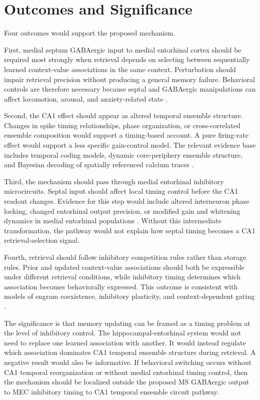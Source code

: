 \section{Outcomes and Significance}

Four outcomes would support the proposed mechanism.

First, medial septum GABAergic input to medial entorhinal cortex should be required most strongly when retrieval depends on selecting between sequentially learned context-value associations in the same context. Perturbation should impair retrieval precision without producing a general memory failure. Behavioral controls are therefore necessary because septal and GABAergic manipulations can affect locomotion, arousal, and anxiety-related state \cite{arxiv181200625,arxiv221113591}.

Second, the CA1 effect should appear as altered temporal ensemble structure. Changes in spike timing relationships, phase organization, or cross-correlated ensemble composition would support a timing-based account. A pure firing-rate effect would support a less specific gain-control model. The relevant evidence base includes temporal coding models, dynamic core-periphery ensemble structure, and Bayesian decoding of spatially referenced calcium traces \cite{arxiv200106371,arxiv191211126,arxiv250809576}.

Third, the mechanism should pass through medial entorhinal inhibitory microcircuits. Septal input should affect local timing control before the CA1 readout changes. Evidence for this step would include altered interneuron phase locking, changed entorhinal output precision, or modified gain and whitening dynamics in medial entorhinal populations \cite{arxiv171204602,arxiv220910634,arxiv230111955}. Without this intermediate transformation, the pathway would not explain how septal timing becomes a CA1 retrieval-selection signal.

Fourth, retrieval should follow inhibitory competition rules rather than storage rules. Prior and updated context-value associations should both be expressible under different retrieval conditions, while inhibitory timing determines which association becomes behaviorally expressed. This outcome is consistent with models of engram coexistence, inhibitory plasticity, and context-dependent gating \cite{arxiv250601659,arxiv181211581,arxiv231019614}.

The significance is that memory updating can be framed as a timing problem at the level of inhibitory control. The hippocampal-entorhinal system would not need to replace one learned association with another. It would instead regulate which association dominates CA1 temporal ensemble structure during retrieval. A negative result would also be informative. If behavioral switching occurs without CA1 temporal reorganization or without medial entorhinal timing control, then the mechanism should be localized outside the proposed MS GABAergic output to MEC inhibitory timing to CA1 temporal ensemble circuit pathway.
